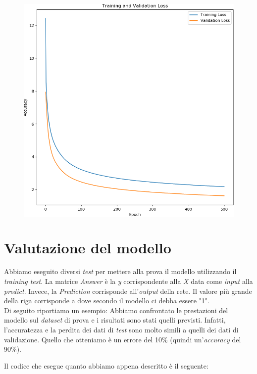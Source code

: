 \begin{figure}[H]
	\centering
	\includegraphics[scale=0.40]{./images/plot2.png}
\end{figure}

\section{Valutazione del modello}
Abbiamo eseguito diversi \textit{test} per mettere alla prova il modello utilizzando il \textit{training test}. La matrice \textit{Answer} è la \textit{y} corrispondente alla \textit{X} data come \textit{input} alla \textit{predict}. Invece, la \textit{Prediction} corrisponde all'\textit{output} della rete. Il valore più grande della riga corrisponde a dove secondo il modello ci debba essere "1".\\
\newline
Di seguito riportiamo un esempio:
\vspace*{2ex}
\vspace*{2ex}
\noindent Abbiamo confrontato le prestazioni del modello sul \textit{dataset} di prova e i risultati sono stati quelli previsti. Infatti, l'accuratezza e la perdita dei dati di \textit{test} sono molto simili a quelli dei dati di validazione. Quello che otteniamo è un errore del 10\% (quindi un'\textit{accuracy} del 90\%).
\vspace*{2ex}
\vspace*{2ex}

Il codice che esegue quanto abbiamo appena descritto è il seguente:
\vspace*{2ex}
\vspace*{2ex}
